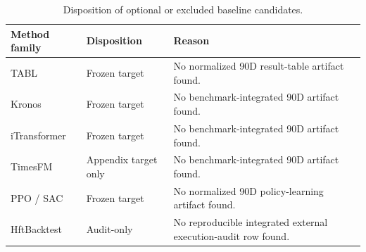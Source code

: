 \begin{table}[t]
\centering
\caption{Disposition of optional or excluded baseline candidates.}
\label{tab:table_29_excluded_candidates}
\begin{tabular}{lll}
\toprule
Method family & Disposition & Reason \\
\midrule
TABL & Frozen target & No normalized 90D result-table artifact found. \\
Kronos & Frozen target & No benchmark-integrated 90D artifact found. \\
iTransformer & Frozen target & No benchmark-integrated 90D artifact found. \\
TimesFM & Appendix target only & No benchmark-integrated 90D artifact found. \\
PPO / SAC & Frozen target & No normalized 90D policy-learning artifact found. \\
HftBacktest & Audit-only & No reproducible integrated external execution-audit row found. \\
\bottomrule
\end{tabular}
\end{table}
